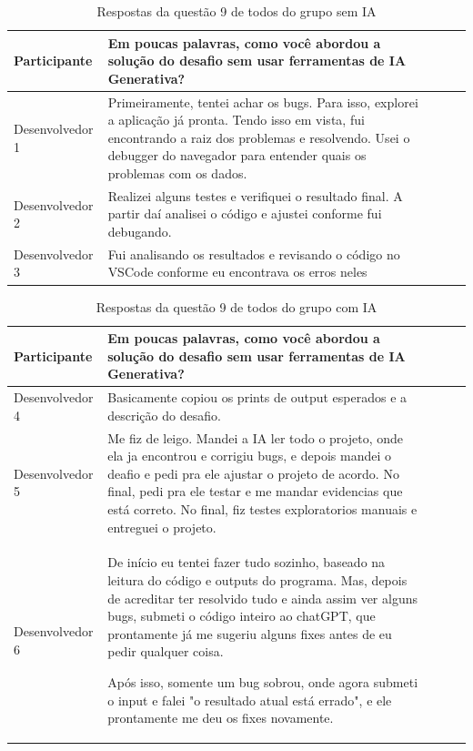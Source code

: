 \documentclass[english,brazilian]{UNISINOSartigo} %
\begin{document}
\begin{table}[ht]
    \caption{Respostas da questão 9 de todos do grupo sem IA}
    \label{tab:questao9_sem_ia}
    \centering%
    \footnotesize
    \begin{tabularx}{\textwidth}{lXXXX}
        \toprule
        \textbf{Participante} & \textbf{Em poucas palavras, como você abordou a solução do desafio sem usar ferramentas de IA Generativa?} \\
        \midrule
        Desenvolvedor 1 & Primeiramente, tentei achar os bugs. Para isso, explorei a aplicação já pronta. Tendo isso em vista, fui encontrando a raiz dos problemas e resolvendo. Usei o debugger do navegador para entender quais os problemas com os dados. \\
        \midrule
        Desenvolvedor 2 & Realizei alguns testes e verifiquei o resultado final. A partir daí analisei o código e ajustei conforme fui debugando. \\
        \midrule
        Desenvolvedor 3 & Fui analisando os resultados e revisando o código no VSCode conforme eu encontrava os erros neles \\
        \bottomrule
    \end{tabularx}
\end{table}
\FloatBarrier

\begin{table}[ht]
    \caption{Respostas da questão 9 de todos do grupo com IA}
    \label{tab:questao9_com_ia}
    \centering%
    \footnotesize
    \begin{tabularx}{\textwidth}{lXXXX}
        \toprule
        \textbf{Participante} & \textbf{Em poucas palavras, como você abordou a solução do desafio sem usar ferramentas de IA Generativa?} \\
        \midrule
        Desenvolvedor 4 & Basicamente copiou os prints de output esperados e a descrição do desafio. \\
        \midrule
        Desenvolvedor 5 & Me fiz de leigo. Mandei a IA ler todo o projeto, onde ela ja encontrou e corrigiu bugs, e depois mandei o deafio e pedi pra ele ajustar o projeto de acordo. No final, pedi pra ele testar e me mandar evidencias que está correto. No final, fiz testes exploratorios manuais e entreguei o projeto. \\
        \midrule
        Desenvolvedor 6 & De início eu tentei fazer tudo sozinho, baseado na leitura do código e outputs do programa. Mas, depois de acreditar ter resolvido tudo e ainda assim ver alguns bugs, submeti o código inteiro ao chatGPT, que prontamente já me sugeriu alguns fixes antes de eu pedir qualquer coisa.

        Após isso, somente um bug sobrou, onde agora submeti o input e falei "o resultado atual está errado", e ele prontamente me deu os fixes novamente. \\
        \bottomrule
    \end{tabularx}
\end{table}
\FloatBarrier
\end{document}
